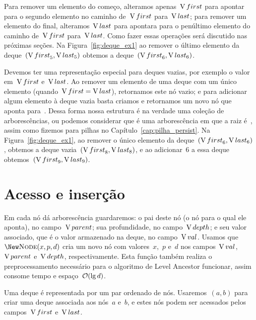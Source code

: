 \documentclass[main.tex]{subfiles}
\begin{document}
Para remover um elemento do começo, alteramos apenas~$\operatorname{V}{first}$ para apontar para o segundo elemento no caminho de~$\operatorname{V}{first}$ para~$\operatorname{V}{last}$; para remover um elemento do final, alteramos~$\operatorname{V}{last}$ para apontara para o penúltimo elemento do caminho de~$\operatorname{V}{first}$ para~$\operatorname{V}{last}$. Como fazer essas operações será discutido nas próximas seções. Na Figura~\ref{fig:deque_ex1} ao remover o último elemento da deque~$(\operatorname{V}{first}_5, \operatorname{V}{last}_5)$ obtemos a deque~$(\operatorname{V}{first}_6, \operatorname{V}{last}_6)$.

Devemos ter uma representação especial para deques vazias, por exemplo o valor~ em~$\operatorname{V}{first}$ e~$\operatorname{V}{last}$. Ao remover um elemento de uma deque com um único elemento (quando~$\operatorname{V}{first}=\operatorname{V}{last}$), retornamos este nó vazio; e para adicionar algum elemento à deque vazia basta criamos e retornamos um novo nó que aponta para~. Dessa forma nossa estrutura é na verdade uma coleção de arborescências, ou podemos considerar que é uma arborescência em que a raiz é~, assim como fizemos para pilhas no Capítulo~\ref{cap:pilha_persist}. Na Figura~\ref{fig:deque_ex1}, ao remover o único elemento da deque~$(\operatorname{V}{first}_6, \operatorname{V}{last}_6)$, obtemos a deque vazia~$(\operatorname{V}{first}_8, \operatorname{V}{last}_8)$, e ao adicionar~6 a essa deque obtemos~$(\operatorname{V}{first}_9, \operatorname{V}{last}_9)$.

\section{Acesso e inserção}

Em cada nó dá arborescência guardaremos: o pai deste nó (o nó para o qual ele aponta), no campo~$\operatorname{V}{parent}$; sua profundidade, no campo~$\operatorname{V}{depth}$; e seu valor associado, que é o valor armazenado na deque, no campo~$\operatorname{V}{val}$. Usamos que~$\New \Call{Node}{x, p, d}$ cria um novo nó com valores~$x$,~$p$ e~$d$ nos campos~$\operatorname{V}{val}$,~$\operatorname{V}{parent}$ e~$\operatorname{V}{depth}$, respectivamente. Esta função também realiza o preprocessamento necessário para o algoritmo de Level Ancestor funcionar, assim consome tempo e espaço~$\mathcal{O}(\lg d)$.

Uma deque é representada por um par ordenado de nós. Usaremos~$(a, b)$ para criar uma deque associada aos nós~$a$ e~$b$, e estes nós podem ser acessados pelos campos~$\operatorname{V}{first}$ e~$\operatorname{V}{last}$.
\end{document}
